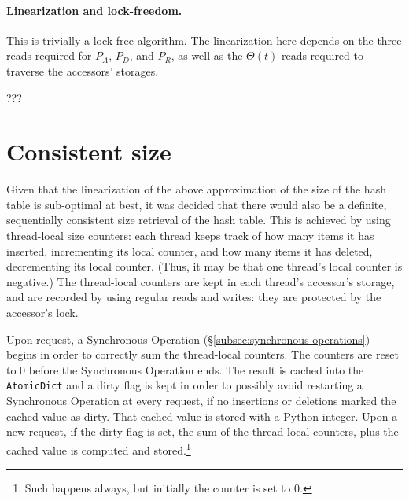 \paragraph{Linearization and lock-freedom.}
This is trivially a lock-free algorithm.
The linearization here depends on the three reads required for $P_A$, $P_D$, and $P_R$, as well as the $\Theta(t)$ reads required to traverse the accessors' storages.

???

\section{Consistent size}\label{sec:consistent-size}

Given that the linearization of the above approximation of the size of the hash table is sub-optimal at best, it was decided that there would also be a definite, sequentially consistent size retrieval of the hash table.
This is achieved by using thread-local size counters: each thread keeps track of how many items it has inserted, incrementing its local counter, and how many items it has deleted, decrementing its local counter.
(Thus, it may be that one thread's local counter is negative.)
The thread-local counters are kept in each thread's accessor's storage, and are recorded by using regular reads and writes: they are protected by the accessor's lock.

Upon request, a Synchronous Operation (\S\ref{subsec:synchronous-operations}) begins in order to correctly sum the thread-local counters.
The counters are reset to 0 before the Synchronous Operation ends.
The result is cached into the \texttt{AtomicDict} and a dirty flag is kept in order to possibly avoid restarting a Synchronous Operation at every request, if no insertions or deletions marked the cached value as dirty.
That cached value is stored with a Python integer.
Upon a new request, if the dirty flag is set, the sum of the thread-local counters, plus the cached value is computed and stored.\footnote{%
	Such happens always, but initially the counter is set to 0.
}

